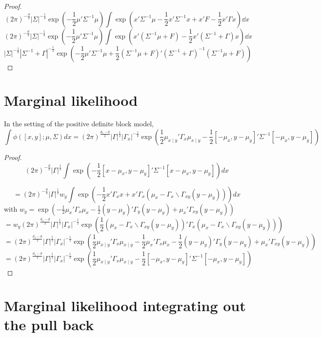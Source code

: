 \documentclass[11pt]{article}
\begin{document}
\begin{proof}
\[
 (2\pi)^{-\frac{d}{2}}|\Sigma|^{-\frac12}\exp(-\frac12 \mu'\Sigma^{-1}\mu) \int\exp(x'\Sigma^{-1}\mu -\frac12  x'\Sigma^{-1} x + x'F - \frac12 x' \Gamma x) \dd x
\]
\[
 (2\pi)^{-\frac{d}{2}}|\Sigma|^{-\frac12}\exp(-\frac12 \mu'\Sigma^{-1}\mu) \int\exp(x'(\Sigma^{-1}\mu + F)-\frac12  x'(\Sigma^{-1} + \Gamma)x  ) \dd x
\]
\[
|\Sigma|^{-\frac12}|\Sigma^{-1}+\Gamma|^{-\frac12}\exp(-\frac12 \mu'\Sigma^{-1}\mu + \frac12 (\Sigma^{-1}\mu + F)'(\Sigma^{-1}+\Gamma)^{-1}(\Sigma^{-1}\mu + F))
\]
\end{proof}

\section{Marginal likelihood}
In the setting of the positive definite block model,
\[
\int\phi([x,y]; \mu, \Sigma) d x 
= (2\pi)^{\tfrac{d_x - d}2}|\Gamma|^{\frac12} |\Gamma_x|^{-\frac12}   \exp\left(\frac12 \mu_{x\mid y}'\Gamma_x \mu_{x\mid y}
-\frac12[ - \mu_x, y - \mu_y]' \Sigma^{-1}[ - \mu_x, y - \mu_y]
\right) 
\]
\begin{proof}

\[
(2\pi)^{-\frac{d}2}|\Gamma|^{\frac12} \int \exp\left(-\frac12[x - \mu_x, y - \mu_y]' \Sigma^{-1}[x - \mu_x, y - \mu_y]\right) d x
\]

\[
=(2\pi)^{-\frac{d}2}|\Gamma|^{\frac12} w_y\int \exp\left(-\frac12x '\Gamma_x x + x' \Gamma_x (\mu_x - \Gamma_x\backslash \Gamma_{xy}(y - \mu_y))
\right) d x
\]
with $w_y = \exp\left(-\frac12 \mu_x'\Gamma_x \mu_x-\frac12(y - \mu_y)'\Gamma_y(y-\mu_y) + \mu_x' \Gamma_{xy}(y - \mu_y)\right)$
\[
= w_y (2\pi)^{\frac{d_x - d}2}|\Gamma|^{\frac12} |\Gamma_x|^{-\frac12}   \exp\left(\frac12 (\mu_x - \Gamma_x\backslash \Gamma_{xy}(y - \mu_y))'\Gamma_x (\mu_x - \Gamma_x\backslash \Gamma_{xy}(y - \mu_y))
\right)  
\]
\[
= (2\pi)^{\frac{d_x - d}2}|\Gamma|^{\frac12} |\Gamma_x|^{-\frac12}    \exp\left(\frac12 \mu_{x\mid y}'\Gamma_x \mu_{x\mid y}
-\frac12 \mu_x'\Gamma_x \mu_x-\frac12(y - \mu_y)'\Gamma_y(y-\mu_y) + \mu_x' \Gamma_{xy}(y - \mu_y)
\right)  
\]
\[
= (2\pi)^{\frac{d_x - d}2}|\Gamma|^{\frac12} |\Gamma_x|^{-\frac12}   \exp\left(\frac12 \mu_{x\mid y}'\Gamma_x \mu_{x\mid y}
-\frac12[ - \mu_x, y - \mu_y]' \Sigma^{-1}[ - \mu_x, y - \mu_y]
\right)  
\]
\end{proof}


\section{Marginal likelihood integrating out the pull back}
\end{document}
